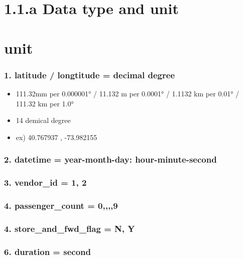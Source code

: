 \documentclass[11pt]{article}
\providecommand{\tightlist}{%
      \setlength{\itemsep}{0pt}\setlength{\parskip}{0pt}}
\begin{document}
    \section{1.1.a Data type and unit}\label{a-data-type-and-unit}

    \section{unit}\label{unit}

\subsubsection{1. latitude / longtitude = decimal
degree}\label{latitude-longtitude-decimal-degree}

\begin{itemize}
\tightlist
\item
  111.32mm per 0.000001° / 11.132 m per 0.0001° / 1.1132 km per 0.01° /
  111.32 km per 1.0°
\item
  14 demical degree
\item
  ex) 40.767937 , -73.982155
\end{itemize}

\subsubsection{2. datetime = year-month-day:
hour-minute-second}\label{datetime-year-month-day-hour-minute-second}

\subsubsection{3. vendor\_id = 1, 2}\label{vendor_id-1-2}

\subsubsection{4. passenger\_count = 0,,,,9}\label{passenger_count-09}

\subsubsection{4. store\_and\_fwd\_flag = N,
Y}\label{store_and_fwd_flag-n-y}

\subsubsection{6. duration = second}\label{duration-second}
\end{document}
